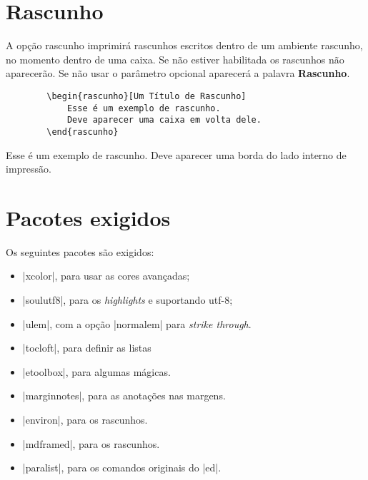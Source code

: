 \documentclass{article}
\begin{document}
    
    
    
    \section{Rascunho}
    
    A opção rascunho imprimirá rascunhos escritos dentro de um ambiente rascunho, no momento dentro de uma caixa. Se não estiver habilitada os rascunhos não aparecerão. Se não usar o parâmetro opcional aparecerá a palavra \textbf{Rascunho}.
    
    \begin{verbatim}
        \begin{rascunho}[Um Título de Rascunho]
            Esse é um exemplo de rascunho.
            Deve aparecer uma caixa em volta dele.
        \end{rascunho}
    \end{verbatim}
    
    \begin{rascunho}
        Esse é um exemplo de rascunho.
        Deve aparecer uma borda do lado interno de impressão.
    \end{rascunho}
    
    \section{Pacotes exigidos}
    
    Os seguintes pacotes são exigidos:
    \begin{itemize}
        \item |xcolor|, para usar as cores avançadas;
        \item |soulutf8|, para os \textit{highlights} e suportando utf-8;
        \item |ulem|, com a opção |normalem| para \textit{strike through}.
        \item |tocloft|, para definir as listas
        \item |etoolbox|, para algumas mágicas.
        \item |marginnotes|, para as anotações nas margens.
        \item |environ|, para os rascunhos.
        \item |mdframed|, para os rascunhos.
        \item |paralist|, para os comandos originais do |ed|.
    \end{itemize}
    
\end{document}
